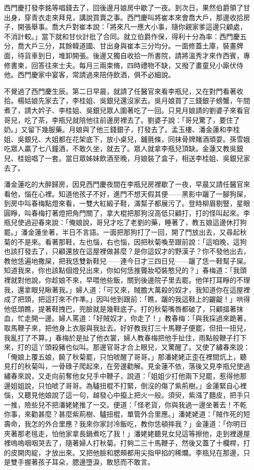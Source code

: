 西門慶打發李銘等唱錢去了，回後邊月娘房中歇了一夜。到次日，果然伯爵領了甘出身，穿青衣走來拜見，講說買賣之事。西門慶叫將崔本來會喬大戶，那邊收拾房子，開張舉事。喬大戶對崔本說：「將來凡一應大小事，隨你親家爹這邊只顧處，不消計較。」當下就和甘伙計批了合同。就立伯爵作保，得利十分為率：西門慶五分，喬大戶三分，其餘韓道國、甘出身與崔本三分均分。一面修蓋土庫，裝畫牌面，待貨車到日，堆卸開張。後邊又獨自收拾一所書院，請將溫秀才來作西賓，專修書柬，回答往來士夫。每月三兩束脩，四時禮物不缺，又撥了畫童兒小廝伏侍他。西門慶家中宴客，常請過來陪侍飲酒，俱不必細說。

不覺過了西門慶生辰。第二日早晨，就請了任醫官來看李瓶兒，又在對門看著收拾。楊姑娘先家去了，李桂姐、吳銀兒還沒家去。吳月娘買了三錢銀子螃蟹，午間煮了，請大妗子、李桂姐、吳銀兒眾人圍著吃了一回。只見月娘請的劉婆子來看官哥兒，吃了茶，李瓶兒就陪他往前邊房裡去了。劉婆子說：「哥兒驚了，要住了奶。」又留下幾服藥。月娘與了他三錢銀子，打發去了。孟玉樓、潘金蓮和李桂姐、吳銀兒、大姐都在花架底下，放小桌兒，鋪氈條，同抹骨牌賭酒頑耍。孫雪娥吃眾人贏了七八鐘酒，不敢久坐，就去了。眾人就拿李瓶兒頂缺。金蓮又教吳銀兒、桂姐唱了一套。當日眾姊妹飲酒至晚，月娘裝了盒子，相送李桂姐、吳銀兒家去了。

潘金蓮吃的大醉歸房，因見西門慶夜間在李瓶兒房裡歇了一夜，早晨又請任醫官來看他，惱在心裡。知道他孩子不好，進門不想天假其便——黑影中躧了一腳狗屎，到房中叫春梅點燈來看，一雙大紅緞子鞋，滿幫子都展污了。登時柳眉剔豎，星眼圓睜，叫春梅打著燈把角門關了，拿大棍把那狗沒高低只顧打，打的怪叫起來。李瓶兒使過迎春來說：「俺娘說，哥兒才吃了老劉的藥，睡著了，教五娘這邊休打狗罷。」潘金蓮坐著，半日不言語。一面把那狗打了一回，開了門放出去，又尋起秋菊的不是來。看著那鞋，左也惱，右也惱，因把秋菊喚至跟前說：「這咱晚，這狗也該打發去了，只顧還放在這屋裡做甚麼？是你這奴才的野漢子？你不發他出去，教他恁遍地撒屎，把我恁雙新鞋兒——連今日才三四日兒——躧了恁一鞋幫子屎。知道我來，你也該點個燈兒出來，你如何恁推聾妝啞裝憨兒的？」春梅道：「我頭裡就對他說，你趁娘不來，早喂他些飯，關到後邊院子里去罷。他佯打耳睜的不理我，還拿眼兒瞅著我。」婦人道：「可又來，賊膽大萬殺的奴才，我知道你在這屋裡成了把頭，把這打來不作準。」因叫他到跟前：「瞧，躧的我這鞋上的齷齪！」哄得他低頭瞧，提著鞋拽巴，兜臉就是幾鞋底子。打的秋菊嘴唇都破了，只顧搵著抹血，忙走開一邊。婦人罵道：「好賊奴才，你走了！」教春梅：「與我採過來跪著，取馬鞭子來，把他身上衣服與我扯去。好好教我打三十馬鞭子便罷，但扭一扭兒，我亂打了不算。」春梅於是扯了他衣裳，婦人教春梅把他手扯住，雨點般鞭子打下來，打的這丫頭殺豬也似叫。那邊官哥才合上眼兒，又驚醒了。又使了繡春來說：「俺娘上覆五娘，饒了秋菊罷，只怕唬醒了哥哥。」那潘姥姥正歪在裡間炕上，聽見打的秋菊叫，一骨碌子爬起來，在旁邊勸解。見金蓮不依，落後又見李瓶兒使過繡春來說，又走向前奪他女兒手中鞭子，說道：「姐姐少打他兩下兒罷，惹得他那邊姐姐說，只怕唬了哥哥。為驢扭棍不打緊，倒沒的傷了紫荊樹。」金蓮緊自心裡惱，又聽見他娘說了這一句，越發心中攛上把火一般。須臾，紫漒了麵皮，把手只一推，險些兒不把潘姥姥推了一交。便道：「怪老貨，你與我過一邊坐著去！不乾你事，來勸甚麼？甚麼紫荊樹、驢扭棍，單管外合里應。」潘姥姥道：「賊作死的短壽命，我怎的外合里應？我來你家討冷飯吃，教你恁頓摔我？」金蓮道：「你明日夾著那老毴走，怕他家拿長鍋煮吃了我！」潘姥姥聽見女兒這等擦他，走到裡邊屋裡嗚嗚咽咽哭去了，隨著婦人打秋菊。打夠二三十馬鞭子，然後又蓋了十欄桿，打的皮開肉綻，才放出來。又把他臉和腮頰都用尖指甲掐的稀爛。李瓶兒在那邊，只是雙手握著孩子耳朵，腮邊墮淚，敢怒而不敢言。

